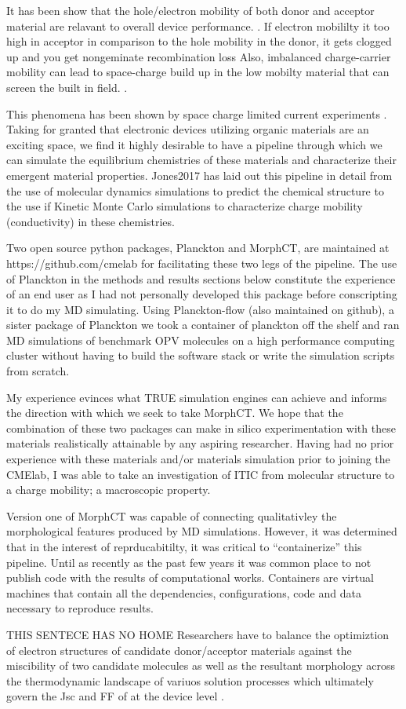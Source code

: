 It has been show that the hole/electron mobility of both donor and acceptor material are
relavant to overall device performance. \cite{Wang2019e}. If electron mobililty it too high
in acceptor in comparison to the hole mobility in the donor, it gets clogged up and you get 
nongeminate recombination loss
Also, imbalanced charge-carrier mobility can lead to space-charge build up in the low mobilty material that
can screen the built in field.  \cite{Bartelt2015}. 

This phenomena has been shown by space charge limited current experiments \cite{Small2013}.
Taking for granted that electronic devices utilizing organic materials are an exciting
space, we find it highly desirable to have a pipeline through which we can simulate the equilibrium
chemistries of these materials and characterize their emergent material properties. Jones2017 has laid out this
pipeline in detail from the use of molecular dynamics simulations to predict the chemical structure to the use
if Kinetic Monte Carlo simulations to characterize charge mobility (conductivity) in these chemistries.

Two open source python packages, Planckton and MorphCT, are maintained at https://github.com/cmelab for
facilitating these two legs of the pipeline. The use of Planckton in the methods and results sections below
constitute the experience of an end user as I had not personally developed this package before conscripting it
to do my MD simulating. Using Planckton-flow (also maintained on github), a sister package
of Planckton we took a container of planckton off the shelf and ran MD simulations of benchmark OPV
molecules on a high performance computing cluster without having to build the software stack or write the
simulation scripts from scratch. 

My experience evinces what TRUE simulation engines can achieve and
informs the direction with which we seek to take MorphCT. We hope that the combination of these two packages
can make in silico experimentation with these materials realistically attainable by any aspiring researcher.
Having had no prior experience with these materials and/or materials simulation prior to joining the CMElab,
I was able to take an investigation of ITIC from molecular
structure to a charge mobility; a macroscopic property. 

Version one of MorphCT was capable of
connecting qualitativley the morphological features produced by MD simulations. However, it was determined
that in the interest of reprducabitilty, it was critical to ``containerize'' this pipeline. Until as recently as
the past few years it was common place to not publish code with the results of computational works. Containers
are virtual machines that contain all the dependencies, configurations, code and data necessary to reproduce
results. \cite{Cito2016a}

THIS SENTECE HAS NO HOME Researchers have to
balance the optimiztion of electron structures of candidate donor/acceptor materials against the miscibility
of two candidate molecules as well as the resultant morphology across the thermodynamic landscape of
variuos solution processes which ultimately govern the Jsc and FF of at the device level \cite{Zhu2020a}. 
